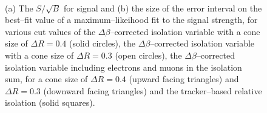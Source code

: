 \begin{figure}[h!]
\begin{center}
~\\
\end{center}
\caption{(a) The $S/\sqrt{B}$ for \Ztautau signal and (b) the size of the error interval on 
the best--fit value of a maximum--likeihood fit to the \Ztautau signal strength,
for various cut values of the $\Delta\beta$--corrected
isolation variable with a cone size of $\Delta R = 0.4$ (solid circles), 
the $\Delta\beta$--corrected isolation variable with a cone size of $\Delta R = 0.3$ (open circles),
the $\Delta\beta$--corrected isolation variable including electrons and muons in the isolation
sum, for a cone size of $\Delta R =0.4$ (upward facing triangles) and $\Delta R =0.3$ (downward facing triangles) and
the tracker--based relative isolation (solid squares).}
\label{fig:mssm_selection_mt_muons}
\end{figure}

